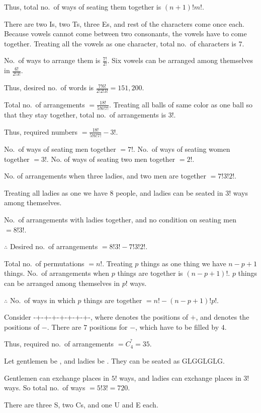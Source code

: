  Thus, total no.\  of ways of seating them together is $(n + 1)!m!$.
\item There are two I\symbol[rightquote]s, two T\symbol[rightquote]s, three E\symbol[rightquote]s, and rest
  of the characters come once each. Because vowels cannot come between two consonants, the vowels have to
  come together. Treating all the vowels as one character, total no.\ of characters is $7$.

  No.\ of ways to arrange them is $\frac{7!}{2!}$. Six vowels can be arranged among themselves in
  $\frac{6!}{2!3!}$.

  Thus, desired no.\ of words is $\frac{7!6!}{2!2!3!} = 151,200$.
\item Total no.\ of arrangements $= \frac{18!}{5!6!7!}$. Treating all balls of same color as one ball so that
  they stay together, total no.\ of arrangements is $3!$.

  Thus, required numbers $= \frac{18!}{5!6!7!} - 3!$.
\item No.\ of ways of seating men together $= 7!$. No.\ of ways of seating women together $= 3!$. No. of
  ways of seating two men together $= 2!$.

  No. of arrangements when three ladies, and two men are together $= 7!3!2!$.

  Treating all ladies as one we have $8$ people, and ladies can be seated in $3!$ ways among themselves.

  No.\ of arrangements with ladies together, and no condition on seating men $= 8!3!$.

  $\therefore$ Desired no.\ of arrangements $= 8!3! - 7!3!2!$.
\item Total no.\ of permutations $= n!$. Treating $p$ things as one thing we have $n - p + 1$ things. No.\
  of arrangements when $p$ things are together is $(n - p + 1)!$. $p$ things can be arranged among
  themselves in $p!$ ways.

  $\therefore$ No.\ of ways in which $p$ things are together $= n! - (n - p + 1)!p!$.
\item Consider -+-+-+-+-+-+-+-, where \quote{+} denotes the positions of $+$, and \quote{-} denotes the
  positions of $-$. There are $7$ positions for $-$, which have to be filled by $4$.

  Thus, required no.\ of arrangements $= C_4^^7 = 35$.
\item Let gentlemen be , and ladies be . They can be seated as GLGGLGLG.

  Gentlemen can exchange places in $5!$ ways, and ladies can exchange places in $3!$ ways. So total no.\ of
  ways $= 5!3! = 720$.
\item There are three S\symbol[rightquote], two C\symbol[rightquote]s, and one U and E each.

